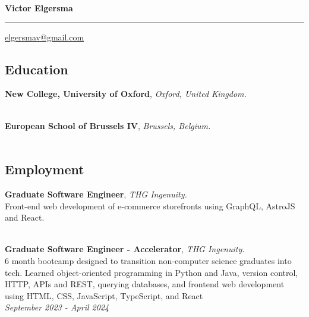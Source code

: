 \documentclass[11pt, a4paper]{article}
\begin{document}
{\Large \textbf{Victor Elgersma}} 
\vspace{0.1cm} %

\hrule 
\vspace{0.1cm} %

\href{mailto:elgersmav@gmail.com}{elgersmav@gmail.com} 


\subsection*{Education}
    \begin{flushleft}
        \hspace{1cm}\textbf{New College, University of Oxford}, \textit{Oxford, United Kingdom.} \\
         \\
    \end{flushleft}

\begin{flushleft}
        \hspace{1cm}\textbf{European School of Brussels IV}, \textit{Brussels, Belgium.} \\
        \hspace{1cm}{European Baccalaureate, 2018} \\
    \end{flushleft}

\subsection*{Employment}

\begin{flushleft}
    \hspace{1cm}\textbf{Graduate Software Engineer}, \textit{THG Ingenuity.} \\
    \hspace{1cm}\hangindent=1cm Front-end web development of e-commerce storefronts using GraphQL, AstroJS and React. \\
     \\
\end{flushleft}

\begin{flushleft}
    \hspace{1cm}\textbf{Graduate Software Engineer - Accelerator}, \textit{THG Ingenuity.} \\
    \hspace{1cm}\hangindent=1cm 6 month bootcamp designed to transition non-computer science graduates into tech. Learned object-oriented programming in Python and Java, version control, HTTP, APIs and REST, querying databases, and frontend web development using HTML, CSS, JavaScript, TypeScript, and React \\
    \hspace{1cm}\textit{{September 2023 - April 2024}} \\
\end{flushleft}
\end{document}
